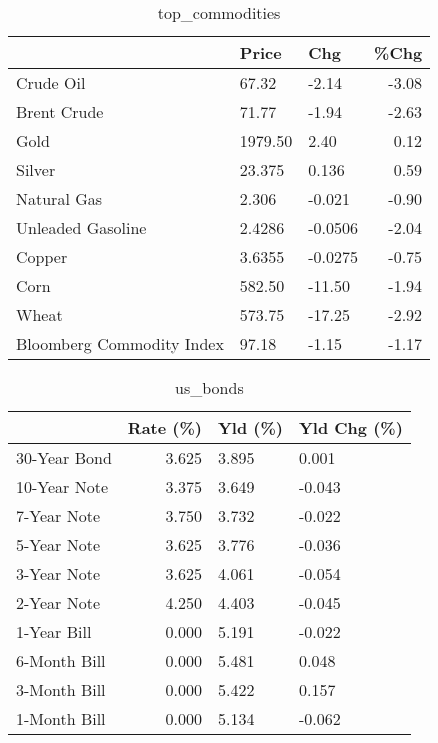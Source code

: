 \documentclass{article}%
\begin{document}
\begin{table}[htbp]%
\caption{top\_commodities}%
\centering%
\begin{adjustbox}{width=1\textwidth}%
\begin{tabular}{lllr}
\toprule
                          &   Price &     Chg &  \%Chg \\
\midrule
               Crude Oil  &   67.32 &   -2.14 & -3.08 \\
             Brent Crude  &   71.77 &   -1.94 & -2.63 \\
                    Gold  & 1979.50 &    2.40 &  0.12 \\
                  Silver  &  23.375 &   0.136 &  0.59 \\
             Natural Gas  &   2.306 &  -0.021 & -0.90 \\
       Unleaded Gasoline  &  2.4286 & -0.0506 & -2.04 \\
                  Copper  &  3.6355 & -0.0275 & -0.75 \\
                    Corn  &  582.50 &  -11.50 & -1.94 \\
                   Wheat  &  573.75 &  -17.25 & -2.92 \\
Bloomberg Commodity Index &   97.18 &   -1.15 & -1.17 \\
\bottomrule
\end{tabular}
%
\end{adjustbox}%
\end{table}

%


\begin{table}[htbp]%
\caption{us\_bonds}%
\centering%
\begin{adjustbox}{width=1\textwidth}%
\begin{tabular}{lrll}
\toprule
             &  Rate (\%) & Yld (\%) & Yld Chg (\%) \\
\midrule
30-Year Bond &     3.625 &   3.895 &       0.001 \\
10-Year Note &     3.375 &   3.649 &      -0.043 \\
 7-Year Note &     3.750 &   3.732 &      -0.022 \\
 5-Year Note &     3.625 &   3.776 &      -0.036 \\
 3-Year Note &     3.625 &   4.061 &      -0.054 \\
 2-Year Note &     4.250 &   4.403 &      -0.045 \\
 1-Year Bill &     0.000 &   5.191 &      -0.022 \\
6-Month Bill &     0.000 &   5.481 &       0.048 \\
3-Month Bill &     0.000 &   5.422 &       0.157 \\
1-Month Bill &     0.000 &   5.134 &      -0.062 \\
\bottomrule
\end{tabular}
%
\end{adjustbox}%
\end{table}
\end{document}
